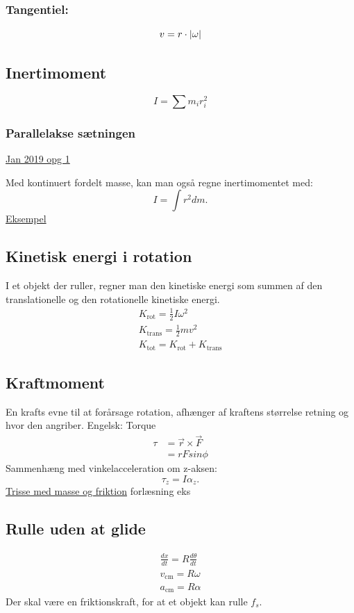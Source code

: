 \documentclass[a4paper,oneside,article]{memoir}
\begin{document}
\subsubsection{Tangentiel:}
\[v=r\cdot \br[5]{\omega}\]

\newpage
\subsection{Inertimoment} \label{scc:inertimoment}
\[I = \sum m_ir_i^2\]
\subsubsection{Parallelakse sætningen} \label{sssc:parallelakse}
\hyperref[asc:Jan 2019 opg 1]{Jan 2019 opg 1}

Med kontinuert fordelt masse, kan man også regne inertimomentet med: \[I = \int r^2dm. \]
\hyperref[fig:inertimomentdør]{Eksempel}

\subsection{Kinetisk energi i rotation} \label{scc:kinrotation}
I et objekt der ruller, regner man den kinetiske energi som summen af den translationelle og den rotationelle kinetiske energi. 
\begin{align*}
    K_\text{rot} = \frac{1}{2}I\omega^2 \\
    K_\text{trans} = \frac{1}{2}mv^2 \\
    K_\text{tot} = K_\text{rot} + K_\text{trans}
\end{align*}

\subsection{Kraftmoment} \label{ssc:kraftmoment}
En krafts evne til at forårsage rotation, afhænger af kraftens størrelse retning og hvor den angriber. 
Engelsk: Torque
\begin{align*}
   \tau &= \Vec{r} \times \Vec{F} \\
   &= rFsin\phi
\end{align*}
Sammenhæng med vinkelacceleration om z-aksen: \[\tau_z=I\alpha_z.\]
\hyperref[asc:Kraftmoment]{Trisse med masse og friktion} forlæsning eks

\subsection{Rulle uden at glide} \label{ssc:ruludenglid}
\begin{align*}
    \frac{dx}{dt} = R\frac{d\theta}{dt} \\
    v_\text{cm} = R\omega \\
    a_\text{cm} = R\alpha
\end{align*}
Der skal være en friktionskraft, for at et objekt kan rulle $f_s$. 
\end{document}
